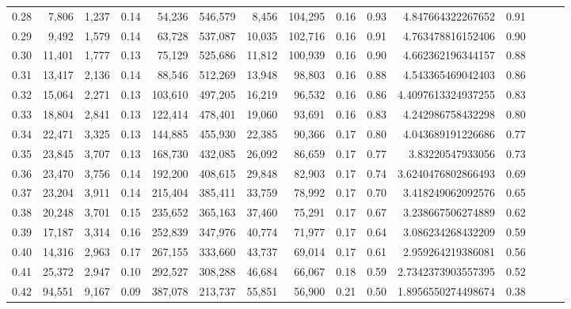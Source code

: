 \begin{tabular}{rrrrrrrrrrrrrrr}
0.28 &    7,806 &   1,237 &  0.14 &   54,236 &  546,579 &    8,456 &  104,295 &  0.16 &  0.93 &       4.847664322267652 &      0.91 \\
0.29 &    9,492 &   1,579 &  0.14 &   63,728 &  537,087 &   10,035 &  102,716 &  0.16 &  0.91 &       4.763478816152406 &      0.90 \\
0.30 &   11,401 &   1,777 &  0.13 &   75,129 &  525,686 &   11,812 &  100,939 &  0.16 &  0.90 &       4.662362196344157 &      0.88 \\
0.31 &   13,417 &   2,136 &  0.14 &   88,546 &  512,269 &   13,948 &   98,803 &  0.16 &  0.88 &       4.543365469042403 &      0.86 \\
0.32 &   15,064 &   2,271 &  0.13 &  103,610 &  497,205 &   16,219 &   96,532 &  0.16 &  0.86 &      4.4097613324937255 &      0.83 \\
0.33 &   18,804 &   2,841 &  0.13 &  122,414 &  478,401 &   19,060 &   93,691 &  0.16 &  0.83 &       4.242986758432298 &      0.80 \\
0.34 &   22,471 &   3,325 &  0.13 &  144,885 &  455,930 &   22,385 &   90,366 &  0.17 &  0.80 &       4.043689191226686 &      0.77 \\
0.35 &   23,845 &   3,707 &  0.13 &  168,730 &  432,085 &   26,092 &   86,659 &  0.17 &  0.77 &        3.83220547933056 &      0.73 \\
0.36 &   23,470 &   3,756 &  0.14 &  192,200 &  408,615 &   29,848 &   82,903 &  0.17 &  0.74 &      3.6240476802866493 &      0.69 \\
0.37 &   23,204 &   3,911 &  0.14 &  215,404 &  385,411 &   33,759 &   78,992 &  0.17 &  0.70 &       3.418249062092576 &      0.65 \\
0.38 &   20,248 &   3,701 &  0.15 &  235,652 &  365,163 &   37,460 &   75,291 &  0.17 &  0.67 &       3.238667506274889 &      0.62 \\
0.39 &   17,187 &   3,314 &  0.16 &  252,839 &  347,976 &   40,774 &   71,977 &  0.17 &  0.64 &       3.086234268432209 &      0.59 \\
0.40 &   14,316 &   2,963 &  0.17 &  267,155 &  333,660 &   43,737 &   69,014 &  0.17 &  0.61 &       2.959264219386081 &      0.56 \\
0.41 &   25,372 &   2,947 &  0.10 &  292,527 &  308,288 &   46,684 &   66,067 &  0.18 &  0.59 &      2.7342373903557395 &      0.52 \\
0.42 &   94,551 &   9,167 &  0.09 &  387,078 &  213,737 &   55,851 &   56,900 &  0.21 &  0.50 &      1.8956550274498674 &      0.38 \\

\end{tabular}
